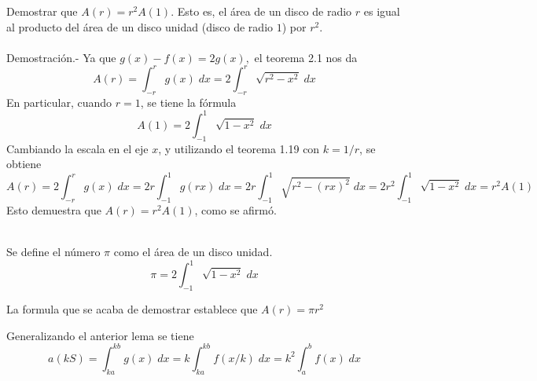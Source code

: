     \begin{lema} Demostrar que $A(r) = r^2 A(1)$. Esto es, el área de un disco de radio $r$ es igual al producto del área de un disco unidad (disco de radio $1$) por $r^2$.\\\\
	Demostración.-\; Ya que $g(x) - f(x) = 2g(x),$ el teorema 2.1 nos da 
	    $$A(r) = \int_{-r}^r g(x) \; dx = 2 \int_{-r}^r \sqrt{r^2 - x^2} \; dx$$
	    En particular, cuando $r = 1$, se tiene la fórmula $$A(1) = 2\int_{-1}^1 \sqrt{1 - x^2} \; dx$$
	    Cambiando la escala en el eje $x$, y utilizando el teorema 1.19 con $k=1/r$, se obtiene
	    $$A(r) = 2\int_{-r}^r g(x) \; dx = 2r \int_{-1}^1 g(rx) \; dx = 2r\int_{-1}^1 \sqrt{r^2 - (rx)^2} \; dx = 2r^2 \int_{-1}^1 \sqrt{1-x^2} \; dx = r^2 A(1)$$
	    Esto demuestra que $A(r) = r^2 A(1)$, como se afirmó.\\\\
    \end{lema}

\begin{tcolorbox}
    \begin{def.} Se define el número $\pi$ como el área de un disco unidad.
	$$\pi = 2 \int_{-1}^1 \sqrt{1-x^2}\; dx$$
    \end{def.}
\end{tcolorbox}
\begin{center}
    La formula que se acaba de demostrar establece que $A(r) = \pi r^2$\\
\end{center}

\begin{tcolorbox}
Generalizando el anterior lema se tiene 
    $$a(kS) = \int_{ka}^{kb} g(x)\; dx = k \int_{ka}^{kb} f(x/k) \; dx = k^2 \int_a^b f(x) \; dx$$
\end{tcolorbox}

